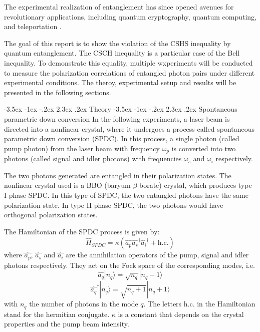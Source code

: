 \documentclass[a4paper, 12pt,oneside]{article}
\makeatletter
\renewcommand{\section}{\@startsection {section}{1}{\z@}%
             {-3.5ex \@plus -1ex \@minus -.2ex}%
             {2.3ex \@plus.2ex}%
             {\normalfont\normalsize\bfseries}}
\renewcommand{\subsection}{\@startsection {subsection}{1}{\z@}%
             {-3.5ex \@plus -1ex \@minus -.2ex}%
             {2.3ex \@plus.2ex}%
             {\normalfont\normalsize\bfseries}}
\makeatother
\begin{document}
The experimental realization of entanglement has since opened avenues for revolutionary applications, including quantum cryptography, quantum computing, and teleportation \cite{applications}.

The goal of this report is to show the violation of the CSHS inequality by quantum entanglement. The CSCH inequality is a particular case of the Bell inequality. To demonstrate this equality, multiple wxperiments will be conducted to measure  the polarization correlations of entangled photon pairs under different experimental conditions. The theroy, experimental setup and results will be presented in the following sections.

\section{Theory}
\subsection{Spontaneous parametric down conversion}
In the following experiments, a laser beam is directed into a nonlinear crystal, where it undergoes a process called spontaneous parametric down conversion (SPDC). In this process, a single photon (called pump photon) from the laser beam with frequency $\omega_p$ is converted into two photons (called signal and idler photons) with frequencies $\omega_s$ and $\omega_i$ respectively. 

The two photons generated are entangled in their polarization states. The nonlinear crystal used is a BBO (baryum $\beta$-borate) crystal, which produces type I phase SPDC. In this type of SPDC, the two entangled photons have the same polarization state. In type II phase SPDC, the two photons would have orthogonal polarization states.

The Hamiltonian of the SPDC process is given by:
\begin{equation}
    \hat{H}_{SPDC} = \kappa (\hat{a_p} \hat{a_s}^\dagger \hat{a_i}^\dagger + \text{h.c.})
\end{equation}
where $\hat{a_p}$, $\hat{a_s}$ and $\hat{a_i}$ are the annihilation operators of the pump, signal and idler photons respectively. They act on the Fock space of the corresponding modes, i.e. 
\begin{equation}
    \hat{a_q} |n_q\rangle = \sqrt{n_q} |n_q - 1\rangle
\end{equation}
\begin{equation}
    \hat{a_q}^\dagger |n_q\rangle = \sqrt{n_q + 1} |n_q + 1\rangle
\end{equation}
with $n_q$ the number of photons in the mode $q$.
The letters h.c. in the Hamiltonian stand for the hermitian conjugate. $\kappa$ is a constant that depends on the crystal properties and the pump beam intensity.
\end{document}
